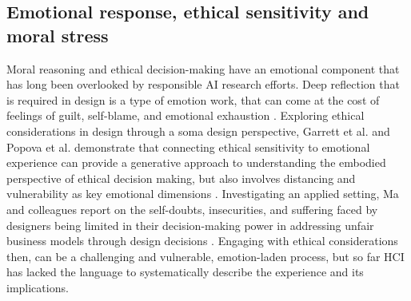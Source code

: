 

\subsection{Emotional response, ethical sensitivity and moral stress}
Moral reasoning and ethical decision-making have an emotional component that has long been overlooked by responsible AI research efforts. Deep reflection that is required in design is a type of emotion work, that can come at the cost of feelings of guilt, self-blame, and emotional exhaustion \cite{ballam2019emotionwork}. Exploring ethical considerations in design through a soma design perspective, Garrett et al. \cite{garrett2023felt} and Popova et al. \cite{popova2022vulnerability} demonstrate that connecting ethical sensitivity to emotional experience can provide a generative approach to understanding the embodied perspective of ethical decision making, but also involves distancing and vulnerability as key emotional dimensions \cite{popova2023should}. Investigating an applied setting, Ma and colleagues report on the self-doubts, insecurities, and suffering faced by designers being limited in their decision-making power in addressing unfair business models through design decisions \cite{Ma2024SenseOfMorality}. Engaging with ethical considerations then, can be a challenging and vulnerable, emotion-laden process, but so far HCI has lacked the language to systematically describe the experience and its implications.

